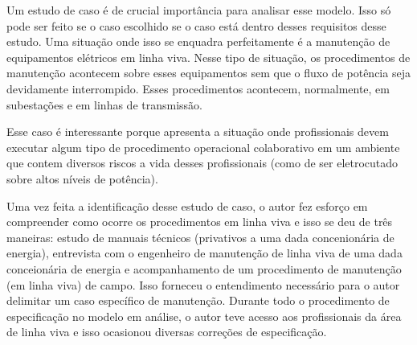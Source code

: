 Um estudo de caso é de crucial importância para analisar esse modelo. Isso só pode ser feito se o caso escolhido se o caso está dentro desses requisitos desse estudo. Uma situação onde isso se enquadra perfeitamente é a manutenção de equipamentos elétricos em linha viva. Nesse tipo de situação, os procedimentos de manutenção acontecem sobre esses equipamentos sem que o fluxo de potência seja devidamente interrompido. Esses procedimentos acontecem, normalmente, em subestações e em linhas de transmissão. 

Esse caso é interessante porque apresenta a situação onde profissionais devem executar algum tipo de procedimento operacional colaborativo em um ambiente que contem diversos riscos a vida desses profissionais (como de ser eletrocutado sobre altos níveis de potência).

Uma vez feita a identificação desse estudo de caso, o autor fez esforço em compreender como ocorre os procedimentos em linha viva e isso se deu de três maneiras: 
estudo de manuais técnicos (privativos a uma dada concenionária de energia), entrevista com o engenheiro de manutenção de linha viva de uma dada conceionária de energia e acompanhamento de um procedimento de manutenção (em linha viva) de campo. Isso forneceu o entendimento necessário para o autor delimitar um caso específico de manutenção. Durante todo o procedimento de especificação no modelo em análise, o autor teve acesso aos profissionais da área de linha viva e isso ocasionou diversas correções de especificação.  